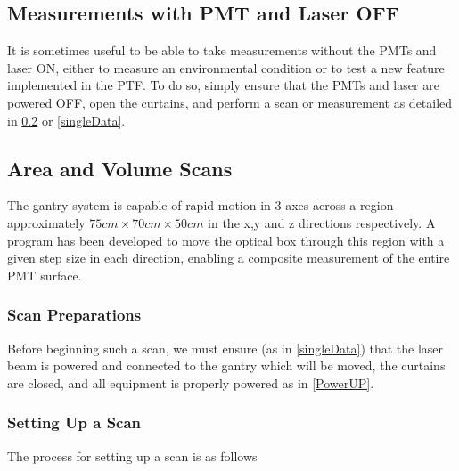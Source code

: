 \documentclass[twoside,letterpaper]{refart}
\begin{document}
\subsection{Measurements with PMT and Laser OFF}

It is sometimes useful to be able to take measurements without the PMTs and laser ON, either to measure an environmental condition or to test a new feature implemented in the PTF.  To do so, simply ensure that the PMTs and laser are powered OFF, open the curtains, and perform a scan or measurement as detailed in \ref{AreaScan} or \ref{singleData}.

\subsection{Area and Volume Scans} \label{AreaScan}

The gantry system is capable of rapid motion in 3 axes across a region approximately $75cm\times 70cm\times 50cm$ in the x,y and z directions respectively.  A program has been developed to move the optical box through this region with a given step size in each direction, enabling a composite measurement of the entire PMT surface.  

\subsubsection{Scan Preparations}

Before beginning such a scan, we must ensure (as in \ref{singleData}) that the laser beam is powered and connected to the gantry which will be moved, the curtains are closed, and all equipment is properly powered as in \ref{PowerUP}. 




\subsubsection{Setting Up a Scan}

The process for setting up a scan is as follows
\end{document}

